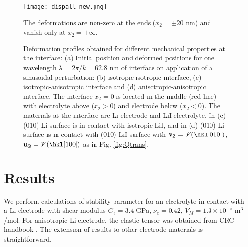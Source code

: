 \documentclass[%
reprint,
 amsmath,amssymb,
 aps,
 prb,
]{revtex4-1}
\newcommand*{\rtvec}[1]{\mathbf{#1}}
\begin{document}
\iffalse
\begin{figure*}[htbp]
\begin{subfigure}{0.45\textwidth}
{\texttt{[image: nodisp.pdf]}}
\caption{without displacement}
\end{subfigure}
\begin{subfigure}{0.45\textwidth}
{\texttt{[image: iso-iso.pdf]}}
\caption{isotropic-isotropic interface}
\end{subfigure}
\begin{subfigure}{0.45\textwidth}
{\texttt{[image: iso-aniso.pdf]}}
\caption{isotropic-anisotropic interface}
\end{subfigure}
\begin{subfigure}{0.45\textwidth}
{\texttt{[image: aniso-aniso.pdf]}}
\caption{anisotropic-anisotropic interface}
\end{subfigure}
\caption{\label{fig:deform} (color online). Deformation field for different interfaces: isotropic-isotropic, isotropic-anisotropic and anisotropic-anisotropic. The interface materials are: Li-LiI with (c) (010) Li surface in contact with isotropic LiI, (d) (010) Li surface with (010) LiI surface with $\rtvec{v_2}=\mathscr{V}(\hkl[010])$, $\rtvec{u_2}=\mathscr{V}(\hkl[100])$ as in Fig. \ref{fig:Qtrans}.}
\end{figure*}
\fi

\begin{figure*}[htbp]
\texttt{[image: dispall\_new.png]}
\caption{\label{fig:deform} Deformation profiles obtained for different mechanical properties at the interface: (a) Initial position and deformed positions for one wavelength $\lambda=2\pi/k=62.8$ nm of interface on application of a sinusoidal perturbation: (b) isotropic-isotropic interface, (c) isotropic-anisotropic interface and (d) anisotropic-anisotropic interface. The interface $x_2=0$ is located in the middle (red line) with electrolyte above ($x_2>0$) and electrode below ($x_2<0$). The materials at the interface are Li electrode and LiI electrolyte. In (c) (010) Li surface is in contact with isotropic LiI, and in (d) (010) Li surface is in contact with (010) LiI surface with $\rtvec{v_2}=\mathscr{V}(\hkl[010])$, $\rtvec{u_2}=\mathscr{V}(\hkl[100])$ as in Fig. \ref{fig:Qtrans}.} The deformations are non-zero at the ends ($x_2=\pm 20$ nm) and vanish only at $x_2=\pm \infty$.
\end{figure*}

\section{Results}\label{sec:results}
We perform calculations of stability parameter for an electrolyte in contact with a Li electrode with shear modulus $G_e=3.4$ GPa, $\nu_e=0.42$, $V_M=1.3\times 10^{-5}$ $\mathrm{m^3}$/mol. For anisotropic Li electrode, the elastic tensor was obtained from CRC handbook \cite{crcelastic}. The extension of results to other electrode materials is straightforward.
\end{document}
